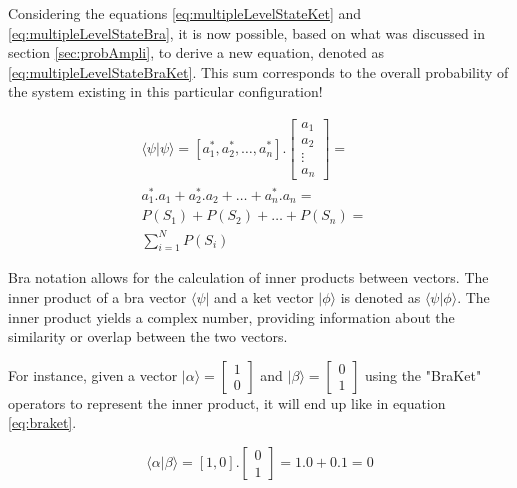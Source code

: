 			\par Considering the equations \ref{eq:multipleLevelStateKet} and \ref{eq:multipleLevelStateBra}, it is now possible, based on what was discussed in section \ref{sec:probAmpli}, to derive a new equation, denoted as \ref{eq:multipleLevelStateBraKet}. This sum corresponds to the overall probability of the system existing in this particular configuration!
			
			
			\begin{equation}
				\begin{aligned}
					\langle\psi|\psi\rangle = [a_1^*, a_2^*, \dots, a_n^*] . \begin{bmatrix}
						a_{1} \\
						a_{2} \\
						\vdots \\
						a_{n}
					\end{bmatrix} = &\\ 
					a_1^*.a_1 + a_2^*.a_2 + \dots + a_n^*.a_n = &\\
					P(S_1) + P(S_2) + \dots + P(S_n) = &\\
					\sum_{i=1}^{N} P(S_i)
				\end{aligned}
				\label{eq:multipleLevelStateBraKet}
			\end{equation}
		
			\par Bra notation allows for the calculation of inner products between vectors. The inner product of a bra vector $\langle \psi |$ and a ket vector $| \phi \rangle$ is denoted as $\langle \psi | \phi \rangle$. The inner product yields a complex number, providing information about the similarity or overlap between the two vectors.\newline
			
			\par For instance, given a vector 
				$|\alpha\rangle= 
				\begin{bmatrix}
					1 \\
					0
				\end{bmatrix}
				$
				 and 
				 $|\beta\rangle = \begin{bmatrix}
					0\\
					1
				\end{bmatrix}$ 
				using the "BraKet" operators to represent the inner product, it will end up like in equation \ref{eq:braket}.
			
			\begin{equation}
				\label{eq:braket}
				\langle \alpha | \beta \rangle = 
				[1, 0] .
				\begin{bmatrix}
					0 \\
					1
				\end{bmatrix} = 1.0 + 0.1 = 0
			\end{equation}


